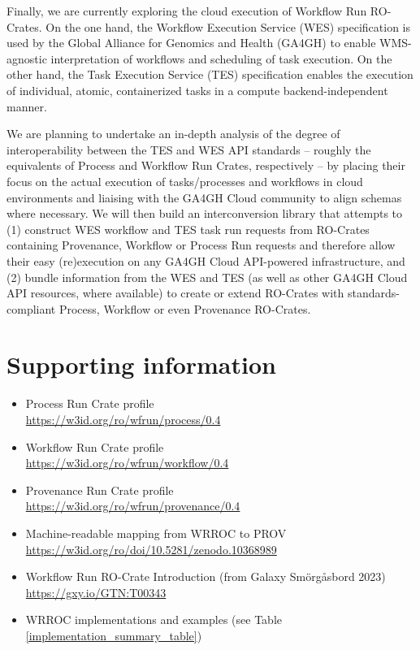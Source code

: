 \documentclass[10pt,letterpaper]{article}
\begin{document}
Finally, we are currently exploring the cloud execution of Workflow Run RO-Crates.
On the one hand, the Workflow Execution Service (WES) specification is used by the Global Alliance for Genomics and Health (GA4GH) \cite{Rehm 2021} to enable WMS-agnostic interpretation of workflows and scheduling of task execution. On the other hand, the Task Execution Service (TES) specification enables the execution of individual, atomic, containerized tasks in a compute backend-independent manner.

We are planning to undertake an in-depth analysis of the degree of interoperability between the TES and WES API standards -- roughly the equivalents of Process and Workflow Run Crates, respectively -- by placing their focus on the actual execution of tasks/processes and workflows in cloud environments and liaising with the GA4GH Cloud community to align schemas where necessary.
We will then build an interconversion library that attempts to (1) construct WES workflow and TES task run requests from RO-Crates containing Provenance, Workflow or Process Run requests and therefore allow their easy (re)execution on any GA4GH Cloud API-powered infrastructure, and (2) bundle information from the WES and TES (as well as other GA4GH Cloud API resources, where available) to create or extend RO-Crates with standards-compliant Process, Workflow or even Provenance RO-Crates.



\section*{Supporting information}

\begin{itemize}
    \item Process Run Crate profile \cite{WRROC 2023a} \\
    \url{https://w3id.org/ro/wfrun/process/0.4}
    \item Workflow Run Crate profile \cite{WRROC 2023b}\\
     \url{https://w3id.org/ro/wfrun/workflow/0.4}
    \item Provenance Run Crate profile \cite{WRROC 2023c}\\
    \url{https://w3id.org/ro/wfrun/provenance/0.4}
    \item Machine-readable mapping from WRROC to PROV \cite{wrroc-crate} \\
    \url{https://w3id.org/ro/doi/10.5281/zenodo.10368989}
    \item Workflow Run RO-Crate Introduction \cite{runcrate-intro} (from Galaxy Smörgåsbord 2023) \\ 
    \url{https://gxy.io/GTN:T00343}
    \item WRROC implementations and examples (see Table \ref{implementation_summary_table})

\end{itemize}
\end{document}
